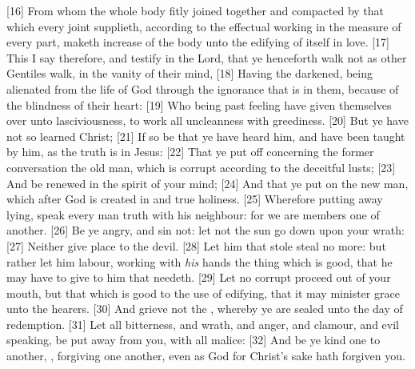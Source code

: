 [16] \textcolor[cmyk]{0.99998,1,0,0}{From whom the whole body fitly joined together and compacted by that which every joint supplieth, according to the effectual working in the measure of every part, maketh increase of the body unto the edifying of itself in love.}
[17] \textcolor[cmyk]{0.99998,1,0,0}{This I say therefore, and testify in the Lord, that ye henceforth walk not as other Gentiles walk, in the vanity of their mind,}
[18] \textcolor[cmyk]{0.99998,1,0,0}{Having the  darkened, being alienated from the life of God through the ignorance that is in them, because of the blindness of their heart:}
[19] \textcolor[cmyk]{0.99998,1,0,0}{Who being past feeling have given themselves over unto lasciviousness, to work all uncleanness with greediness.}
[20] \textcolor[cmyk]{0.99998,1,0,0}{But ye have not so learned Christ;}
[21] \textcolor[cmyk]{0.99998,1,0,0}{If so be that ye have heard him, and have been taught by him, as the truth is in Jesus:}
[22] \textcolor[cmyk]{0.99998,1,0,0}{That ye put off concerning the former conversation the old man, which is corrupt according to the deceitful lusts;}
[23] \textcolor[cmyk]{0.99998,1,0,0}{And be renewed in the spirit of your mind;}
[24] \textcolor[cmyk]{0.99998,1,0,0}{And that ye put on the new man, which after God is created in  and true holiness.}
[25] \textcolor[cmyk]{0.99998,1,0,0}{Wherefore putting away lying, speak every man truth with his neighbour: for we are members one of another.}
[26] \textcolor[cmyk]{0.99998,1,0,0}{Be ye angry, and sin not: let not the sun go down upon your wrath:}
[27] \textcolor[cmyk]{0.99998,1,0,0}{Neither give place to the devil.}
[28] \textcolor[cmyk]{0.99998,1,0,0}{Let him that stole steal no more: but rather let him labour, working with \emph{his} hands the thing which is good, that he may have to give to him that needeth.}
[29] \textcolor[cmyk]{0.99998,1,0,0}{Let no corrupt  proceed out of your mouth, but that which is good to the use of edifying, that it may minister grace unto the hearers.}
[30] \textcolor[cmyk]{0.99998,1,0,0}{And grieve not the , whereby ye are sealed unto the day of redemption.}
[31] \textcolor[cmyk]{0.99998,1,0,0}{Let all bitterness, and wrath, and anger, and clamour, and evil speaking, be put away from you, with all malice:}
[32] \textcolor[cmyk]{0.99998,1,0,0}{And be ye kind one to another, , forgiving one another, even as God for Christ's sake hath forgiven you.}